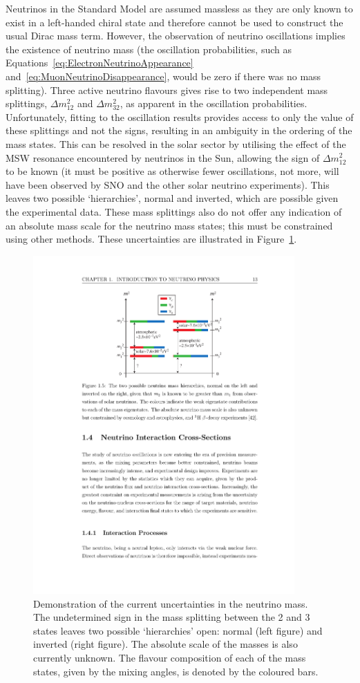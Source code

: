 Neutrinos in the Standard Model are assumed massless as they are only known to exist in a left-handed chiral state and therefore cannot be used to construct the usual Dirac mass term.  However, the observation of neutrino oscillations implies the existence of neutrino mass (the oscillation probabilities, such as Equations~\ref{eq:ElectronNeutrinoAppearance} and~\ref{eq:MuonNeutrinoDisappearance}, would be zero if there was no mass splitting).  Three active neutrino flavours gives rise to two independent mass splittings, $\Delta m_{12}^2$ and $\Delta m_{32}^2$, as apparent in the oscillation probabilities.  Unfortunately, fitting to the oscillation results provides access to only the value of these splittings and not the signs, resulting in an ambiguity in the ordering of the mass states.  This can be resolved in the solar sector by utilising the effect of the MSW resonance encountered by neutrinos in the Sun, allowing the sign of $\Delta m_{12}^2$ to be known (it must be positive as otherwise fewer oscillations, not more, will have been observed by SNO and the other solar neutrino experiments).  This leaves two possible `hierarchies', normal and inverted, which are possible given the experimental data.  These mass splittings also do not offer any indication of an absolute mass scale for the neutrino mass states; this must be constrained using other methods.  These uncertainties are illustrated in Figure~\ref{fig:MassHierarchy}.

\begin{figure}
  \centering
  \includegraphics[width=10cm]{MassHierarchy.pdf}
  \caption[Demonstration of the current uncertainties in the neutrino mass.]{Demonstration of the current uncertainties in the neutrino mass.  The undetermined sign in the mass splitting between the 2 and 3 states leaves two possible `hierarchies' open: normal (left figure) and inverted (right figure).  The absolute scale of the masses is also currently unknown.  The flavour composition of each of the mass states, given by the mixing angles, is denoted by the coloured bars.}
  \label{fig:MassHierarchy}
\end{figure}

